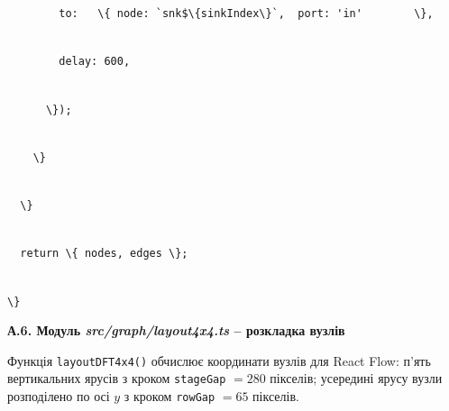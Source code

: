 \documentclass[
]{article}
\newcommand{\passthrough}[1]{#1}
\begin{document}
\passthrough{\lstinline!        !}\passthrough{\lstinline!to:!}\passthrough{\lstinline!   !}\passthrough{\lstinline!\{!}\passthrough{\lstinline! !}\passthrough{\lstinline!node:!}\passthrough{\lstinline! !}\passthrough{\lstinline!`!}\passthrough{\lstinline!snk!}\passthrough{\lstinline!$\{!}\passthrough{\lstinline!sinkIndex!}\passthrough{\lstinline!\}`,!}\passthrough{\lstinline!  !}\passthrough{\lstinline!port:!}\passthrough{\lstinline! !}\passthrough{\lstinline!'in'!}\passthrough{\lstinline!        !}\passthrough{\lstinline!\},!}\strut \\
\passthrough{\lstinline!        !}\passthrough{\lstinline!delay:!}\passthrough{\lstinline! !}\passthrough{\lstinline!600,!}\strut \\
\passthrough{\lstinline!      !}\passthrough{\lstinline!\});!}\strut \\
\passthrough{\lstinline!    !}\passthrough{\lstinline!\}!}\strut \\
\passthrough{\lstinline!  !}\passthrough{\lstinline!\}!}\strut \\
\passthrough{\lstinline!  !}\passthrough{\lstinline!return!}\passthrough{\lstinline! !}\passthrough{\lstinline!\{!}\passthrough{\lstinline! !}\passthrough{\lstinline!nodes,!}\passthrough{\lstinline! !}\passthrough{\lstinline!edges!}\passthrough{\lstinline! !}\passthrough{\lstinline!\};!}\strut \\
\passthrough{\lstinline!\}!}

\textbf{А.6. Модуль \emph{src/graph/layout4x4.ts} -- розкладка вузлів}

Функція
\passthrough{\lstinline!layoutDFT!}\passthrough{\lstinline!4!}\passthrough{\lstinline!x!}\passthrough{\lstinline!4()!}
обчислює координати вузлів для React Flow: п'ять вертикальних ярусів з
кроком \passthrough{\lstinline!stageGap!} \(= 280\) пікселів; усередині
ярусу вузли розподілено по осі \(y\) з кроком
\passthrough{\lstinline!rowGap!} \(= 65\) пікселів.
\end{document}
